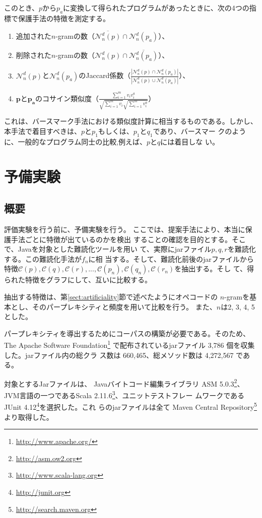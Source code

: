 \documentclass[12pt,twoside]{jbook}
\newcommand{\birth}[1]{\mathcal{C}(#1)}
\newcommand{\distinct}[1]{\mathcal{N}_n^d(#1)}
\begin{document}
このとき、$p$から$p_a$に変換して得られたプログラムがあったときに、次の4つの指標で保護手法の特徴を測定する。
\begin{enumerate}
\item 追加された$n$-gramの数（$\overline{\distinct{p}} \cap \distinct{p_a}$）、
\item 削除された$n$-gramの数（$\distinct{p} \cap \overline{\distinct{p_a}}$）、
\item $\distinct{p}$と$\distinct{p_a}$のJaccard係数（$\displaystyle
  \frac{|\distinct{p} \cap \distinct{p_a}|}{|\distinct{p} \cup
    \distinct{p_a}|}$）、
\item $\bm{p}$と$\bm{p_a}$のコサイン類似度（$\displaystyle
  \frac{\sum_{i=1}^{m} v_i v^a_i}{\sqrt{\sum_{i=1}^m v_i}
    \sqrt{\sum_{i=1}^m v^a_i}}$）
\end{enumerate}

これは、バースマーク手法における類似度計算に相当するものである。しかし、
本手法で着目すべきは、$p$と$p_1$もしくは、$p_1$と$q_1$であり、バースマー
クのように、一般的なプログラム同士の比較,例えば、$p$と$q$には着目しな
い。

\chapter{予備実験}

\section{概要}
評価実験を行う前に、予備実験を行う。
ここでは、提案手法により、本当に保護手法ごとに特徴が出ているのかを検出
することの確認を目的とする。そこで、Javaを対象とした難読化ツールを用い
て、実際にjarファイル$p, q, r$を難読化する。この難読化手法が$f_n$に相
当する。そして、難読化前後のjarファイルから特徴$\birth{p}, \birth{q},
\birth{r}, ..., \birth{p_n}, \birth{q_n}, \birth{r_n}$を抽出する。そし
て、得られた特徴をグラフにして、互いに比較する。

抽出する特徴は、第\ref{sect:artificiality}節で述べたようにオペコードの
$n$-gramを基本とし、そのパープレキシティと頻度を用いて比較を行う。
また、$n$は2, 3, 4, 5とした。

パープレキシティを導出するためにコーパスの構築が必要である。そのため、
The Apache Software Foundation\footnote{\url{http://www.apache.org/}}
で配布されているjarファイル 3,786 個を収集した。jarファイル内の総クラ
ス数は 660,465、総メソッド数は 4,272,567 である。

対象とするJarファイルは、
Javaバイトコード編集ライブラリ ASM
5.0.3\footnote{\url{http://asm.ow2.org}}、JVM言語の一つであるScala
2.11.6\footnote{\url{http://www.scala-lang.org}}、ユニットテストフレー
ムワークである JUnit 4.12\footnote{\url{http://junit.org}}を選択した。これ
らのjarファイルは全て Maven Central
Repository\footnote{\url{http://search.maven.org}} より取得した。
\end{document}
